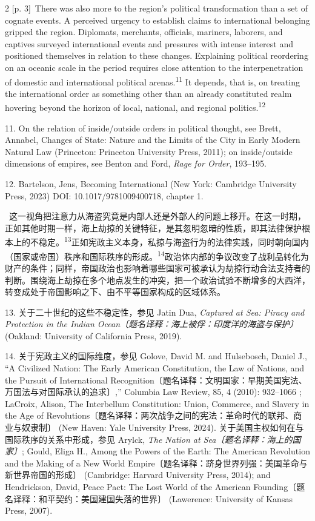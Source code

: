 \documentclass[10pt,a4paper]{article}
\begin{document}
\begin{paracol}{2}
\switchcolumn
{\scriptsize\color{gray} [p. 3]}\ There was also more to the region’s political transformation than a set of cognate events. A perceived urgency to establish claims to international belonging gripped the region. Diplomats, merchants, officials, mariners, laborers, and captives surveyed international events and pressures with intense interest and positioned themselves in relation to these changes. Explaining political reordering on an oceanic scale in the period requires close attention to the interpenetration of domestic and international political arenas.\nobreak\textsuperscript{11} It depends, that is, on treating the international order as something other than an already constituted realm hovering beyond the horizon of local, national, and regional politics.\nobreak\textsuperscript{12}\par{\small 11. On the relation of inside/outside orders in political thought, see Brett, Annabel, Changes of State: Nature and the Limits of the City in Early Modern Natural Law (Princeton: Princeton University Press, 2011); on inside/outside dimensions of empires, see Benton and Ford, \textit{Rage for Order}, 193–195.\par}{\small 12. Bartelson, Jens, Becoming International (New York: Cambridge University Press, 2023) DOI: 10.1017/9781009400718, chapter 1.\par}
\switchcolumn*
{\scriptsize\color{gray} [p. 4]}\ 这一视角把注意力从海盗究竟是内部人还是外部人的问题上移开。在这一时期，正如其他时期一样，海上劫掠的关键特征，是其忽明忽暗的性质，即其法律保护根本上的不稳\mbox{定。\textsuperscript{13}}正如宪政主义本身，私掠与海盗行为的法律实践，同时朝向国内（国家或帝国）秩序和国际秩序的形\mbox{成。\textsuperscript{14}}政治体内部的争议改变了战利品转化为财产的条件；同样，帝国政治也影响着哪些国家可被承认为劫掠行动合法支持者的判断。围绕海上劫掠在多个地点发生的冲突，把一个政治试验不断增多的大西洋，转变成处于帝国影响之下、由不平等国家构成的区域体系。\par{\small 13. 关于二十世纪的这些不稳定性，参见 Jatin Dua, \textit{Captured at Sea: Piracy and Protection in the Indian Ocean〔题名译释：海上被俘：印度洋的海盗与保护〕} (Oakland: University of California Press, 2019).\par}{\small 14. 关于宪政主义的国际维度，参见 Golove, David M. and Hulsebosch, Daniel J., “A Civilized Nation: The Early American Constitution, the Law of Nations, and the Pursuit of International Recognition〔题名译释：文明国家：早期美国宪法、万国法与对国际承认的追求〕,” Columbia Law Review, 85, 4 (2010): 932–1066 ; LaCroix, Alison, The Interbellum Constitution: Union, Commerce, and Slavery in the Age of Revolutions〔题名译释：两次战争之间的宪法：革命时代的联邦、商业与奴隶制〕 (New Haven: Yale University Press, 2024). 关于美国主权如何在与国际秩序的关系中形成，参见 Arylck, \textit{The Nation at Sea〔题名译释：海上的国家〕}; Gould, Eliga H., Among the Powers of the Earth: The American Revolution and the Making of a New World Empire〔题名译释：跻身世界列强：美国革命与新世界帝国的形成〕 (Cambridge: Harvard University Press, 2014); and Hendrickson, David, Peace Pact: The Lost World of the American Founding〔题名译释：和平契约：美国建国失落的世界〕 (Lawerence: University of Kansas Press, 2007).\par}

\end{paracol}
\end{document}
